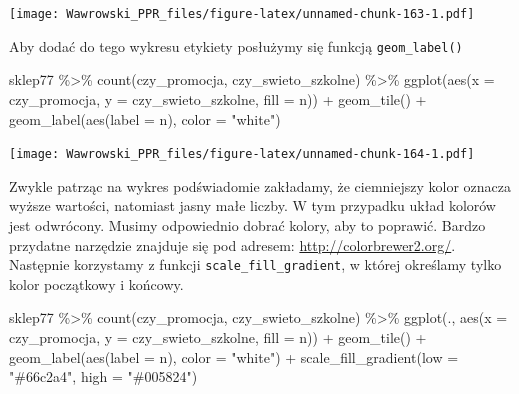 \documentclass[
]{book}
\newenvironment{Shaded}{\begin{snugshade}}{\end{snugshade}}
\newcommand{\AttributeTok}[1]{\textcolor[rgb]{0.77,0.63,0.00}{#1}}
\newcommand{\FunctionTok}[1]{\textcolor[rgb]{0.00,0.00,0.00}{#1}}
\newcommand{\NormalTok}[1]{#1}
\newcommand{\SpecialCharTok}[1]{\textcolor[rgb]{0.00,0.00,0.00}{#1}}
\newcommand{\StringTok}[1]{\textcolor[rgb]{0.31,0.60,0.02}{#1}}
\begin{document}
\texttt{[image: Wawrowski\_PPR\_files/figure-latex/unnamed-chunk-163-1.pdf]}

Aby dodać do tego wykresu etykiety posłużymy się funkcją \texttt{geom\_label()}

\begin{Shaded}
\begin{Highlighting}[]
\NormalTok{sklep77 }\SpecialCharTok{\%\textgreater{}\%}
  \FunctionTok{count}\NormalTok{(czy\_promocja, czy\_swieto\_szkolne) }\SpecialCharTok{\%\textgreater{}\%}
  \FunctionTok{ggplot}\NormalTok{(}\FunctionTok{aes}\NormalTok{(}\AttributeTok{x =}\NormalTok{ czy\_promocja, }
             \AttributeTok{y =}\NormalTok{ czy\_swieto\_szkolne,}
             \AttributeTok{fill =}\NormalTok{ n)) }\SpecialCharTok{+}
  \FunctionTok{geom\_tile}\NormalTok{() }\SpecialCharTok{+}
  \FunctionTok{geom\_label}\NormalTok{(}\FunctionTok{aes}\NormalTok{(}\AttributeTok{label =}\NormalTok{ n), }\AttributeTok{color =} \StringTok{"white"}\NormalTok{)}
\end{Highlighting}
\end{Shaded}

\texttt{[image: Wawrowski\_PPR\_files/figure-latex/unnamed-chunk-164-1.pdf]}

Zwykle patrząc na wykres podświadomie zakładamy, że ciemniejszy kolor oznacza wyższe wartości, natomiast jasny małe liczby. W tym przypadku układ kolorów jest odwrócony. Musimy odpowiednio dobrać kolory, aby to poprawić. Bardzo przydatne narzędzie znajduje się pod adresem: \url{http://colorbrewer2.org/}. Następnie korzystamy z funkcji \texttt{scale\_fill\_gradient}, w której określamy tylko kolor początkowy i końcowy.

\begin{Shaded}
\begin{Highlighting}[]
\NormalTok{sklep77 }\SpecialCharTok{\%\textgreater{}\%}
  \FunctionTok{count}\NormalTok{(czy\_promocja, czy\_swieto\_szkolne) }\SpecialCharTok{\%\textgreater{}\%}
  \FunctionTok{ggplot}\NormalTok{(., }\FunctionTok{aes}\NormalTok{(}\AttributeTok{x =}\NormalTok{ czy\_promocja, }
                \AttributeTok{y =}\NormalTok{ czy\_swieto\_szkolne,}
                \AttributeTok{fill =}\NormalTok{ n)) }\SpecialCharTok{+}
  \FunctionTok{geom\_tile}\NormalTok{() }\SpecialCharTok{+}
  \FunctionTok{geom\_label}\NormalTok{(}\FunctionTok{aes}\NormalTok{(}\AttributeTok{label =}\NormalTok{ n), }\AttributeTok{color =} \StringTok{"white"}\NormalTok{) }\SpecialCharTok{+}
  \FunctionTok{scale\_fill\_gradient}\NormalTok{(}\AttributeTok{low =} \StringTok{"\#66c2a4"}\NormalTok{, }
                      \AttributeTok{high =} \StringTok{"\#005824"}\NormalTok{)}
\end{Highlighting}
\end{Shaded}
\end{document}
